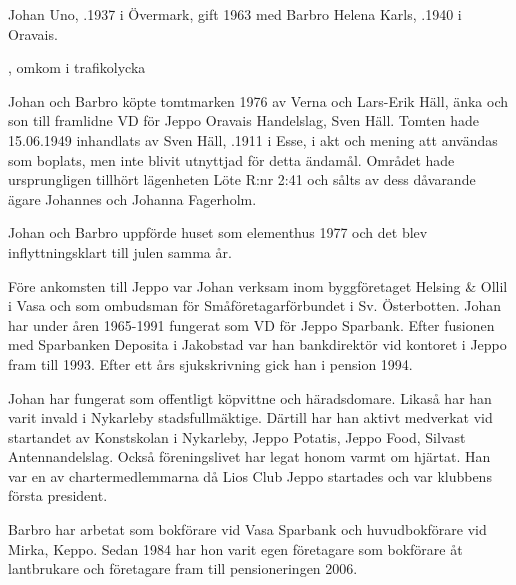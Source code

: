



Johan Uno, .1937 i Övermark, gift 1963 med Barbro Helena Karls, .1940 i Oravais.
\begin{jhchildren}
  \item {}
  \item {}, omkom i trafikolycka
  \item {}
\end{jhchildren}

Johan och Barbro köpte tomtmarken 1976 av Verna och Lars-Erik Häll, änka och son till framlidne VD för Jeppo Oravais Handelslag, Sven Häll.
Tomten hade 15.06.1949 inhandlats av Sven Häll, .1911 i Esse, i akt och mening att användas som boplats, men inte blivit utnyttjad för detta ändamål. Området hade ursprungligen tillhört lägenheten Löte R:nr 2:41 och sålts av dess dåvarande ägare Johannes och Johanna Fagerholm.

Johan och Barbro uppförde huset som elementhus 1977 och det blev inflyttningsklart till julen samma år.

Före ankomsten till Jeppo var Johan verksam inom byggföretaget Helsing \& Ollil i Vasa och som ombudsman för Småföretagarförbundet i Sv. Österbotten. Johan har under åren 1965-1991 fungerat som VD för Jeppo Sparbank. Efter fusionen med Sparbanken Deposita i Jakobstad var han bankdirektör vid kontoret i Jeppo fram till 1993. Efter ett års sjukskrivning gick han i pension 1994.

Johan har  fungerat som offentligt köpvittne  och häradsdomare.	Likaså har han varit invald i Nykarleby stadsfullmäktige. Därtill har	han aktivt medverkat vid startandet av Konstskolan i Nykarleby,	Jeppo Potatis, Jeppo Food, Silvast Antennandelslag. Också föreningslivet har legat honom varmt om hjärtat. Han var en av chartermedlemmarna då Lios Club Jeppo startades och var klubbens första president.

Barbro har arbetat som bokförare vid Vasa Sparbank och huvudbokförare vid Mirka, Keppo. Sedan 1984 har hon varit egen företagare som bokförare åt lantbrukare och företagare fram till pensioneringen 2006.
